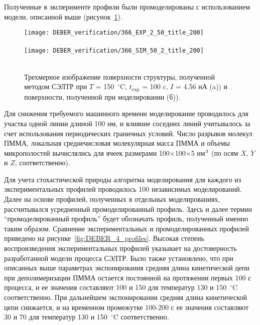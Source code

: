 Полученные в эксперименте профили были промоделированы с использованием модели, описанной выше (рисунок~\ref{fig:DEBER_3D_sim}).
\begin{figure}[h!]
	\begin{center}
		\texttt{[image: DEBER\_verification/366\_EXP\_2\_50\_title\_200]} \\
		\vspace{-10.7em}  \vspace{9.7em} \\
		\vspace{-1em}
		\texttt{[image: DEBER\_verification/366\_SIM\_50\_2\_title\_200]} \\
		\vspace{-10.7em}  \vspace{10.7em} \\
	\end{center}
	\vspace{-2em}
	\caption{Трехмерное изображение поверхности структуры, полученной методом СЭЛТР при $T$ = 150~$^\circ$C, $t_\mathrm{exp}$ = 100 c, $I$ = 4.56 нА (a)) и поверхности, полученной при моделировании (б)).}
	\label{fig:DEBER_3D_sim}
\end{figure}

Для снижения требуемого машинного времени моделирование проводилось для участка одной линии длиной 100 нм, и влияние соседних линий учитывалось за счет использования периодических граничных условий. Число разрывов молекул ПММА, локальная среднечисловая молекулярная масса ПММА и объемы микрополостей вычислялись для ячеек размерами 100$\times$100$\times$5 нм$^\text{3}$ (по осям $X$, $Y$ и $Z$, соответственно).

Для учета стохастической природы алгоритма моделирования для каждого из экспериментальных профилей проводилось 100 независимых моделирований. Далее на основе профилей, полученных в отдельных моделированиях, рассчитывался усредненный промоделированный профиль. Здесь и далее термин ``промоделированный профиль'' будет обозначать профиль, полученный именно таким образом. Сравнение экспериментальных и промоделированных профилей приведено на рисунке~\ref{fig:DEBER_4_profiles}. Высокая степень воспроизведения экспериментальных профилей указывает на достоверность разработанной модели процесса СЭЛТР. Было также установлено, что при описанных выше параметрах экспонирования средняя длина кинетической цепи при деполимеризации ПММА остается постоянной на протяжении первых 100 с процесса, и ее значения составляют 100 и 150 для температур 130 и 150~$^\circ$C соответственно. При дальнейшем экспонировании средняя длина кинетической цепи снижается, и на временном промежутке 100-200 с ее значения составляют 30 и 70 для температур 130 и 150~$^\circ$C соответственно.

